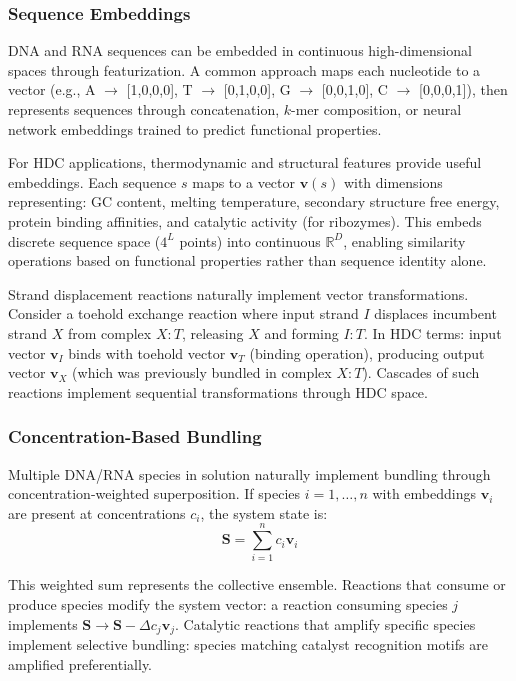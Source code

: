 \documentclass[12pt]{article}
\begin{document}
\subsubsection{Sequence Embeddings}

DNA and RNA sequences can be embedded in continuous high-dimensional spaces through featurization. A common approach maps each nucleotide to a vector (e.g., A $\to$ [1,0,0,0], T $\to$ [0,1,0,0], G $\to$ [0,0,1,0], C $\to$ [0,0,0,1]), then represents sequences through concatenation, $k$-mer composition, or neural network embeddings trained to predict functional properties.

For HDC applications, thermodynamic and structural features provide useful embeddings. Each sequence $s$ maps to a vector $\mathbf{v}(s)$ with dimensions representing: GC content, melting temperature, secondary structure free energy, protein binding affinities, and catalytic activity (for ribozymes). This embeds discrete sequence space ($4^L$ points) into continuous $\mathbb{R}^D$, enabling similarity operations based on functional properties rather than sequence identity alone.

Strand displacement reactions naturally implement vector transformations. Consider a toehold exchange reaction where input strand $I$ displaces incumbent strand $X$ from complex $X:T$, releasing $X$ and forming $I:T$. In HDC terms: input vector $\mathbf{v}_I$ binds with toehold vector $\mathbf{v}_T$ (binding operation), producing output vector $\mathbf{v}_X$ (which was previously bundled in complex $X:T$). Cascades of such reactions implement sequential transformations through HDC space.

\subsubsection{Concentration-Based Bundling}

Multiple DNA/RNA species in solution naturally implement bundling through concentration-weighted superposition. If species $i = 1, \ldots, n$ with embeddings $\mathbf{v}_i$ are present at concentrations $c_i$, the system state is:
\begin{equation}
\mathbf{S} = \sum_{i=1}^n c_i \mathbf{v}_i
\end{equation}

This weighted sum represents the collective ensemble. Reactions that consume or produce species modify the system vector: a reaction consuming species $j$ implements $\mathbf{S} \to \mathbf{S} - \Delta c_j \mathbf{v}_j$. Catalytic reactions that amplify specific species implement selective bundling: species matching catalyst recognition motifs are amplified preferentially.
\end{document}
